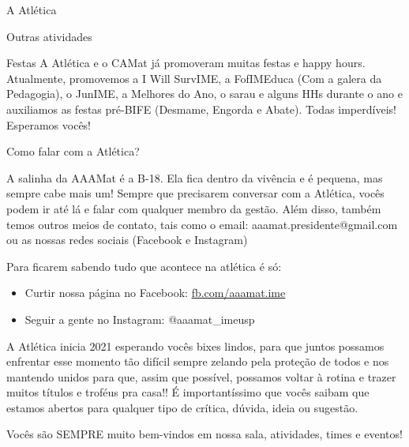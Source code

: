 \begin{secao}{A Atlética}
\begin{subsecao}{Outras atividades}
\begin{subsubsecao}{Festas}
A Atlética e o CAMat já promoveram muitas festas e happy hours. Atualmente,
promovemos a I Will SurvIME, a FofIMEduca (Com a galera da Pedagogia), o 
JunIME, a Melhores do Ano, o sarau e alguns HHs durante o ano e auxiliamos 
as festas pré-BIFE (Desmame, Engorda e Abate). Todas imperdíveis!
Esperamos vocês!

\end{subsubsecao}
\begin{subsubsecao}{Como falar com a Atlética?}

A salinha da AAAMat é a B-18. Ela fica dentro da vivência e é pequena, mas
sempre cabe mais um! Sempre que precisarem conversar com a Atlética, vocês
podem ir até lá e falar com qualquer membro da gestão. Além disso, também temos
outros meios de contato, tais como o email: aaamat.presidente@gmail.com  ou as
nossas redes sociais (Facebook e Instagram)

Para ficarem sabendo tudo que acontece na atlética é só:

\begin{itemize}
  \item Curtir nossa página no Facebook: \url{fb.com/aaamat.ime}
  \item Seguir a gente no Instagram: @aaamat\_imeusp
\end{itemize}

A Atlética inicia 2021 esperando vocês bixes lindos, para que juntos possamos
enfrentar esse momento tão difícil sempre zelando pela proteção de todos e nos
mantendo unidos para que, assim que possível, possamos voltar à rotina e trazer
muitos títulos e troféus pra casa!! É importantíssimo que vocês saibam que
estamos abertos para qualquer tipo de crítica, dúvida, ideia ou sugestão.

Vocês são SEMPRE muito bem-vindos em nossa sala, atividades, times e eventos!
\end{subsubsecao}
\end{subsecao}
\end{secao}
\pagebreak
